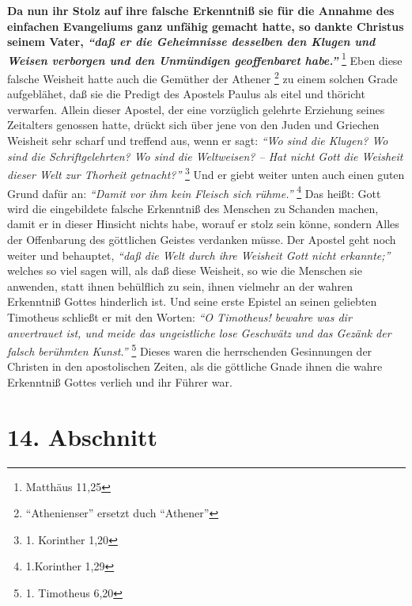 \textbf{Da nun ihr Stolz auf ihre falsche Erkenntniß sie für die Annahme des einfachen
Evangeliums ganz unfähig gemacht hatte, so dankte Christus seinem Vater,
\textit{"`daß er die Geheimnisse desselben den Klugen und Weisen verborgen und den Unmündigen geoffenbaret habe."'}}
\footnote{Matthäus 11,25}
Eben diese falsche Weisheit hatte
auch die Gemüther der Athener \footnote{"`Athenienser"' ersetzt duch "`Athener"'} zu einem solchen Grade aufgeblähet, daß sie
die Predigt des Apostels Paulus als eitel und thöricht verwarfen. Allein dieser
Apostel, der eine vorzüglich gelehrte Erziehung seines Zeitalters genossen
hatte, drückt sich über jene von den Juden und Griechen 
Weisheit sehr scharf und treffend aus, wenn er sagt:
\textit{"`Wo sind die Klugen? Wo
sind die Schriftgelehrten? Wo sind die Weltweisen? -- Hat nicht Gott die
Weisheit dieser Welt zur Thorheit getnacht?"'}
\footnote{1. Korinther 1,20}
Und er
giebt weiter unten auch einen guten Grund dafür an:
\textit{"`Damit vor ihm kein Fleisch sich rühme."'}
\footnote{1.Korinther 1,29}
Das heißt: Gott wird die eingebildete
falsche Erkenntniß des Menschen zu Schanden machen, damit er in dieser Hinsicht
nichts habe, worauf er stolz sein könne, sondern Alles der Offenbarung des
göttlichen Geistes verdanken müsse. Der Apostel geht noch weiter und behauptet,
\textit{"`daß die Welt durch ihre Weisheit Gott nicht erkannte;"'}
welches so viel sagen
will, als daß diese Weisheit, so wie die Menschen sie anwenden, statt ihnen
behülflich zu sein, ihnen vielmehr an der wahren Erkenntniß Gottes hinderlich
ist. Und seine erste Epistel an seinen geliebten Timotheus schließt er mit den
Worten:
\textit{"`O Timotheus! bewahre was dir anvertrauet ist, und meide das
ungeistliche lose Geschwätz und das Gezänk der falsch berühmten
Kunst."'}
\footnote{1. Timotheus 6,20}
Dieses waren die herrschenden Gesinnungen der
Christen in den apostolischen Zeiten, als die göttliche Gnade ihnen die wahre
Erkenntniß Gottes verlieh und ihr Führer war.

\section{14. Abschnitt} \label{kap7_ab14}

